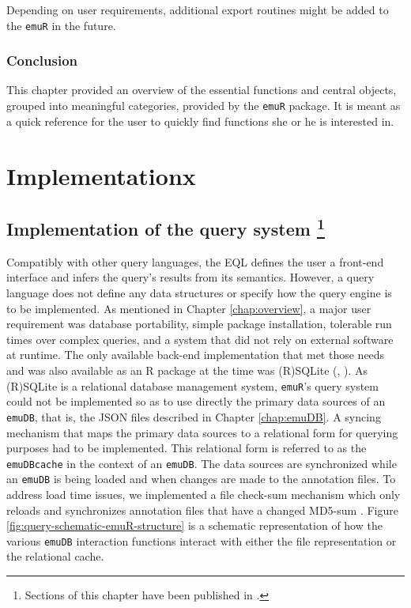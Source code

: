\documentclass[]{book}
\let\rmarkdownfootnote\footnote%
\def\footnote{\protect\rmarkdownfootnote}
\theoremstyle{definition}
\theoremstyle{definition}
\theoremstyle{definition}
\theoremstyle{remark}
\begin{document}
Depending on user requirements, additional export routines might be
added to the \texttt{emuR} in the future.

\hypertarget{conclusion-6}{%
\section{Conclusion}\label{conclusion-6}}

This chapter provided an overview of the essential functions and central
objects, grouped into meaningful categories, provided by the
\texttt{emuR} package. It is meant as a quick reference for the user to
quickly find functions she or he is interested in.

\hypertarget{part-implementationx}{%
\part{Implementationx}\label{part-implementationx}}

\hypertarget{chap:querysys_impl}{%
\chapter[Implementation of the query system
]{\texorpdfstring{Implementation of the query system \footnote{Sections
  of this chapter have been published in \citet{winkelmann:2017aa}.}}{Implementation of the query system }}\label{chap:querysys_impl}}

Compatibly with other query languages, the EQL defines the user a
front-end interface and infers the query's results from its semantics.
However, a query language does not define any data structures or specify
how the query engine is to be implemented. As mentioned in Chapter
\ref{chap:overview}, a major user requirement was database portability,
simple package installation, tolerable run times over complex queries,
and a system that did not rely on external software at runtime. The only
available back-end implementation that met those needs and was also
available as an R package at the time was (R)SQLite (\citet{hipp:2007a},
\citet{wickham:2014a}). As (R)SQLite is a relational database management
system, \texttt{emuR}'s query system could not be implemented so as to
use directly the primary data sources of an \texttt{emuDB}, that is, the
JSON files described in Chapter \ref{chap:emuDB}. A syncing mechanism
that maps the primary data sources to a relational form for querying
purposes had to be implemented. This relational form is referred to as
the \texttt{emuDBcache} in the context of an \texttt{emuDB}. The data
sources are synchronized while an \texttt{emuDB} is being loaded and
when changes are made to the annotation files. To address load time
issues, we implemented a file check-sum mechanism which only reloads and
synchronizes annotation files that have a changed MD5-sum
\citep{rivest:1992a}. Figure \ref{fig:query-schematic-emuR-structure} is
a schematic representation of how the various \texttt{emuDB} interaction
functions interact with either the file representation or the relational
cache.
\end{document}
